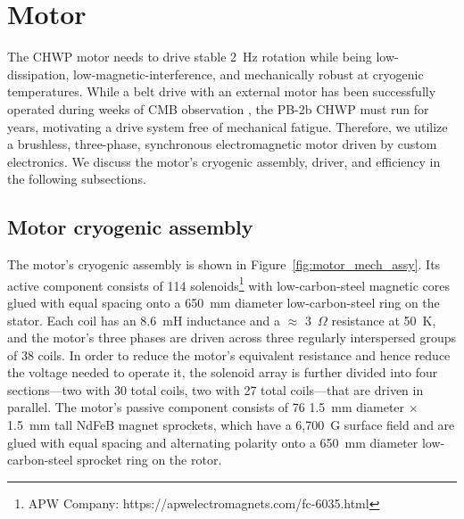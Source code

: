 
\section{Motor}
\label{sec:motor_design} 

The CHWP motor needs to drive stable 2~Hz rotation while being low-dissipation, low-magnetic-interference, and mechanically robust at cryogenic temperatures. While a belt drive with an external motor has been successfully operated during weeks of CMB observation \cite{klein_cryogenic_2011,the_ebex_collaboration_ebex_2018}, the PB-2b CHWP must run for years, motivating a drive system free of mechanical fatigue. Therefore, we utilize a brushless, three-phase, synchronous electromagnetic motor driven by custom electronics. We discuss the motor's cryogenic assembly, driver, and efficiency in the following subsections.


\subsection{Motor cryogenic assembly}
\label{sec:motor_mech} 

The motor's cryogenic assembly is shown in Figure~\ref{fig:motor_mech_assy}. Its active component consists of 114 solenoids\footnote{APW Company: https://apwelectromagnets.com/fc-6035.html} with low-carbon-steel magnetic cores glued with equal spacing onto a 650~mm diameter low-carbon-steel ring on the stator. Each coil has an 8.6~mH inductance and a $\approx$ 3~$\Omega$ resistance at 50~K, and the motor's three phases are driven across three regularly interspersed groups of 38 coils. In order to reduce the motor's equivalent resistance and hence reduce the voltage needed to operate it, the solenoid array is further divided into four sections---two with 30 total coils, two with 27 total coils---that are driven in parallel. The motor's passive component consists of 76 1.5~mm diameter $\times$ 1.5~mm tall NdFeB magnet sprockets, which have a 6,700~G surface field and are glued with equal spacing and alternating polarity onto a 650~mm diameter low-carbon-steel sprocket ring on the rotor.

